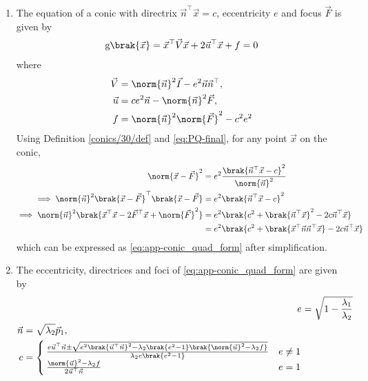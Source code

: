 \documentclass{article}
\numberwithin{equation}{section}
\numberwithin{figure}{section}
\begin{document}
\begin{enumerate}[label=\thesubsection.\arabic*.,ref=\thesubsection.\theenumi]
\item
The equation of  a conic with directrix $\vec{n}^{\top}\vec{x} = c$, eccentricity $e$ and focus $\vec{F}$ is given by 
\begin{align}
    \label{eq:app-conic_quad_form}
	\text{g}\brak{\vec{x}} = \vec{x}^{\top}\vec{V}\vec{x}+2\vec{u}^{\top}\vec{x}+f=0
    \end{align}
where     
\begin{align}
  \label{eq:app-conic_quad_form_v}
\vec{V} &=\norm{\vec{n}}^2\vec{I}-e^2\vec{n}\vec{n}^{\top}, 
\\
\label{eq:app-conic_quad_form_u}
\vec{u} &= ce^2\vec{n}-\norm{\vec{n}}^2\vec{F}, 
\\
\label{eq:app-conic_quad_form_f}
f &= \norm{\vec{n}}^2\norm{\vec{F}}^2-c^2e^2
    \end{align}
    \solution
  Using Definition \ref{conics/30/def} and 
			\eqref{eq:PQ-final},
for any point $\vec{x}$ on the conic,
\begin{align}
	\norm{\vec{x}-\vec{F}}^2&=e^2 \frac{\brak{\vec{n}^{\top}\vec{x} - c}^2}{\norm{\vec{n}}^2}\label{conics/30/eq:1} \\
	\implies \norm{\vec{n}}^2\brak{\vec{x}-\vec{F}}^{\top}\brak{\vec{x}-\vec{F}}&=e^2\brak{\vec{n}^{\top}\vec{x} - c}^2
\\
\implies \norm{\vec{n}}^2\brak{\vec{x}^{\top}\vec{x}-2\vec{F}^{\top}\vec{x}+\norm{\vec{F}}^2}
	&=e^2\brak{c^2+\brak{\vec{n}^{\top}\vec{x} }^2-2c\vec{n}^{\top}\vec{x}} \\
	&=e^2\brak{c^2+\brak{\vec{x}^{\top}\vec{n}\vec{n}^{\top}\vec{x} }-2c\vec{n}^{\top}\vec{x}}
\end{align}
%
which can be expressed as \eqref{eq:app-conic_quad_form} after simplification.
\item
  The eccentricity, directrices and foci of \eqref{eq:app-conic_quad_form} are given by 
\begin{align}
  \label{eq:app-conic_quad_form_e} 
  e&= \sqrt{1-\frac{\lambda_1}{\lambda_2}}
\\
\label{eq:app-conic_quad_form_nc} 
	\begin{split}
  \vec{n}&= \sqrt{\lambda_2}\vec{p}_1,  
\\
	c &= 
  \begin{cases}
    \frac{e\vec{u}^{\top}\vec{n} \pm \sqrt{e^2\brak{\vec{u}^{\top}\vec{n}}^2-\lambda_2\brak{e^2-1}\brak{\norm{\vec{u}}^2 - \lambda_2 f}}}{\lambda_2e\brak{e^2-1}} & e \ne 1
    \\
    \frac{\norm{\vec{u}}^2 - \lambda_2 f   }{2\vec{u}^{\top}\vec{n}} & e = 1

\end{cases}
\end{split}
\end{align}
\end{enumerate}
\end{document}
